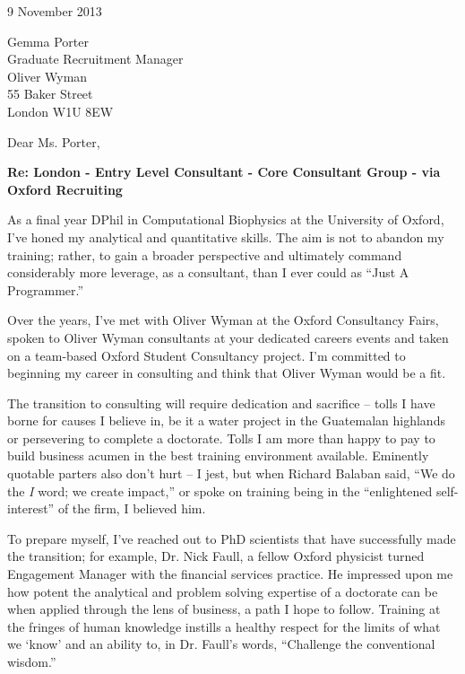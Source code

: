 \documentclass[a4paper]{../res}
\begin{document}
 
\begin{sloppypar}
 
%


\begin{resume} 
 
9 November 2013

Gemma Porter \\
Graduate Recruitment Manager \\
Oliver Wyman \\
55 Baker Street \\
London W1U 8EW

Dear Ms. Porter, %

\textbf{Re: London - Entry Level Consultant - Core Consultant Group - via Oxford Recruiting}

As a final year DPhil in Computational Biophysics at the University of Oxford, I've honed my analytical and quantitative skills. The aim is not to abandon my training; rather, to gain a broader perspective and ultimately command considerably more leverage, as a consultant, than I ever could as ``Just A Programmer.'' 

Over the years, I've met with Oliver Wyman at the Oxford Consultancy Fairs, spoken to Oliver Wyman consultants at your dedicated careers events and taken on a team-based Oxford Student Consultancy project. I'm committed to beginning my career in consulting and think that Oliver Wyman would be a fit.

The transition to consulting will require dedication and sacrifice -- tolls I have borne for causes I believe in, be it a water project in the Guatemalan highlands or persevering to complete a doctorate. Tolls I am more than happy to pay to build business acumen in the best training environment available. Eminently quotable parters also don't hurt -- I jest, but when Richard Balaban said, ``We do the \emph{I} word; we create impact,'' or spoke on training being in the ``enlightened self-interest'' of the firm, I believed him.

To prepare myself, I've reached out to PhD scientists that have successfully made the transition; for example, Dr. Nick Faull, a fellow Oxford physicist turned Engagement Manager with the financial services practice. He impressed upon me how potent the analytical and problem solving expertise of a doctorate can be when applied through the lens of business, a path I hope to follow. Training at the fringes of human knowledge instills a healthy respect for the limits of what we `know' and an ability to, in Dr. Faull's words, ``Challenge the conventional wisdom.''


\end{resume}
\end{sloppypar}
\end{document}
